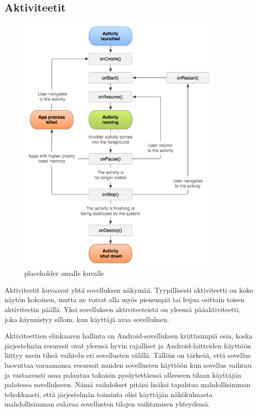 \subsection{Aktiviteetit}

\begin{figure}[htb]
\includegraphics[width=100mm]{activity_lifecycle.png}
\caption{placeholder omalle kuvalle} \label{activity_lifecycle}
\end{figure}

Aktiviteetit kuvaavat yhtä sovelluksen näkymää. Tyypillisesti aktiviteetti on koko näytön kokoinen, mutta ne voivat olla myös pienempiä tai leijua osittain toisen aktiviteetin päällä. Yksi sovelluksen aktiviteeteistä on yleensä pääaktiviteetti, joka käynnistyy silloin, kun käyttäjä avaa sovelluksen. 

Aktiviteettien elinkaaren hallinta on Android-sovelluksen kriittisimpiä osia, koska järjestelmän resurssit ovat yleensä hyvin rajalliset ja Android-laitteiden käyttöön liittyy usein tiheä vaihtelu eri sovellusten välillä. Tällöin on tärkeää, että sovellus luovuttaa varaamansa resurssit muiden sovellusten käyttöön kun sovellus vaihtuu ja vastaavasti osaa palautua takaisin pysäytettäessä olleeseen tilaan käyttäjän palatessa sovellukseen. Nämä vaihdokset pitäisi lisäksi tapahtua mahdollisimman tehokkaasti, että järjestelmän toiminta olisi käyttäjän näkökulmasta mahdollisimman sulavaa sovellusten tilojen vaihtamisen yhteydessä.

